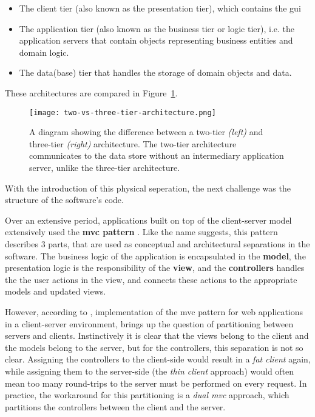 \begin{itemize}
    \item The client tier (also known as the presentation tier), which contains
    the \gls{gui}
    \item The application tier (also known as the business tier or logic tier),
    i.e. the application servers that contain objects representing business
    entities and domain logic.
    \item The data(base) tier that handles the storage of domain objects and data.
\end{itemize}

These architectures are compared in Figure~\ref{fig:two-vs-three-tier-architecture}.

\begin{figure}
    \centering
    \texttt{[image: two-vs-three-tier-architecture.png]}
    \caption[Two vs three tier architecture]{A diagram showing the difference
        between a two-tier \textit{(left)} and three-tier \textit{(right)}
        architecture. The two-tier architecture communicates to the data store
        without an intermediary application server, unlike the three-tier
        architecture.}
    \label{fig:two-vs-three-tier-architecture}
\end{figure}

With the introduction of this physical seperation, the next challenge was the
structure of the software's code.  

Over an extensive period, applications built on top of the client-server model
extensively used the \textbf{\gls{mvc} pattern} \autocite{Pavlenko_etal_2020}. Like the
name suggests, this pattern describes 3 parts, that are used as conceptual and
architectural separations in the software. The business logic of the application
is encapsulated in the \textbf{model}, the presentation logic is the
responsibility of the \textbf{view}, and the \textbf{controllers} handles the
the user actions in the view, and connects these actions to the appropriate
models and updated views.

However, according to \textcite{Leff_Raylfield_2001}, implementation of the
\gls{mvc} pattern for web applications in a client-server environment, brings up
the question of partitioning between servers and clients. Instinctively it is
clear that the views belong to the client and the models belong to the server,
but for the controllers, this separation is not so clear. Assigning the
controllers to the client-side would result in a \textit{fat client} again,
while assigning them to the server-side (the \textit{thin client} approach)
would often mean too many round-trips to the server must be performed on every
request. In practice, the workaround for this partitioning is a \textit{dual
\gls{mvc}} approach, which partitions the controllers between the client and the
server.


